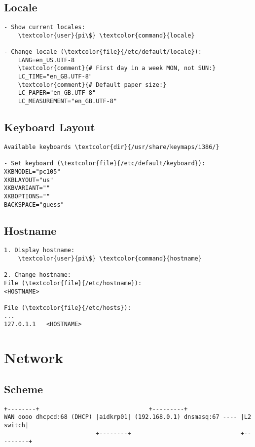 \documentclass[10pt, a4paper, onecolumn, openany]{book} %
\begin{document}
\section{Locale}
\begin{Verbatim}[commandchars=\\\{\}]
- Show current locales:
    \textcolor{user}{pi\$} \textcolor{command}{locale}

- Change locale (\textcolor{file}{/etc/default/locale}):
    LANG=en_US.UTF-8
    \textcolor{comment}{# First day in a week MON, not SUN:}
    LC_TIME="en_GB.UTF-8"
    \textcolor{comment}{# Default paper size:}
    LC_PAPER="en_GB.UTF-8"
    LC_MEASUREMENT="en_GB.UTF-8"
\end{Verbatim}

\section{Keyboard Layout}
\begin{Verbatim}[commandchars=\\\{\}]
Available keyboards \textcolor{dir}{/usr/share/keymaps/i386/}

- Set keyboard (\textcolor{file}{/etc/default/keyboard}):
XKBMODEL="pc105"
XKBLAYOUT="us"
XKBVARIANT=""
XKBOPTIONS=""
BACKSPACE="guess"
\end{Verbatim}

\section{Hostname}
\begin{Verbatim}[commandchars=\\\{\}]
1. Display hostname:
    \textcolor{user}{pi\$} \textcolor{command}{hostname}
    
2. Change hostname:
File (\textcolor{file}{/etc/hostname}):
<HOSTNAME>

File (\textcolor{file}{/etc/hosts}):
...
127.0.1.1   <HOSTNAME>
\end{Verbatim}


\chapter{Network}
\section{Scheme}
\begin{Verbatim}[commandchars=\\\{\}]
                          +--------+                               +---------+
WAN oooo dhcpcd:68 (DHCP) |aidkrp01| (192.168.0.1) dnsmasq:67 ---- |L2 switch|
                          +--------+                               +---------+
\end{Verbatim}
\end{document}
